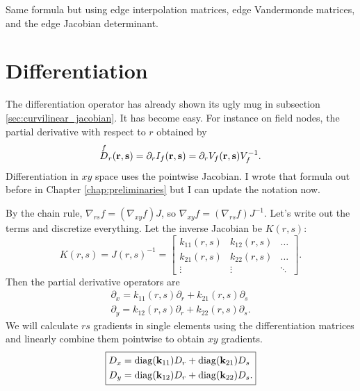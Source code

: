 Same formula but using edge interpolation matrices, edge Vandermonde matrices, and the edge Jacobian determinant.

\section{Differentiation}

The differentiation operator has already shown its ugly mug in subsection \ref{sec:curvilinear_jacobian}.  It has become easy.  For instance on field nodes, the partial derivative with respect to $r$ obtained by
%
\begin{equation}
\overset{f}{D}_r(\textbf{r}, \textbf{s}) = \partial_r I_f(\textbf{r}, \textbf{s}) = \partial_r V_f(\textbf{r}, \textbf{s}) V_f^{-1}.
\end{equation}
%
Differentiation in $xy$ space uses the pointwise Jacobian.  I wrote that formula out before in Chapter \ref{chap:preliminaries} but I can update the notation now.

By the chain rule, $\nabla_{rs} f = (\nabla_{xy}f)J$, so $\nabla_{xy}f = (\nabla_{rs} f) J^{-1}$.  Let's write out the terms and discretize everything.  Let the inverse Jacobian be $K(r,s)$:
%
\begin{equation}
K(r,s) = J(r,s)^{-1} = \begin{bmatrix}
k_{11}(r,s) & k_{12}(r,s) & \hdots \\
k_{21}(r,s) & k_{22}(r,s) & \hdots \\
\vdots & \vdots & \ddots
\end{bmatrix}.
\end{equation}
%
Then the partial derivative operators are
%
\begin{equation}
\begin{aligned}
\partial_x = k_{11}(r,s) \partial_r + k_{21}(r,s) \partial_s \\
\partial_y = k_{12}(r,s) \partial_r + k_{22}(r,s) \partial_s.
\end{aligned}
\end{equation}
%
We will calculate $rs$ gradients in single elements using the differentiation matrices and linearly combine them pointwise to obtain $xy$ gradients.
%
\begin{equation}
\boxed{
\begin{aligned}
D_x &= \mathrm{diag}(\textbf{k}_{11}) D_r + \mathrm{diag}(\textbf{k}_{21}) D_s \\
D_y &= \mathrm{diag}(\textbf{k}_{12}) D_r + \mathrm{diag}(\textbf{k}_{22}) D_s .
\end{aligned}
}
\end{equation}


